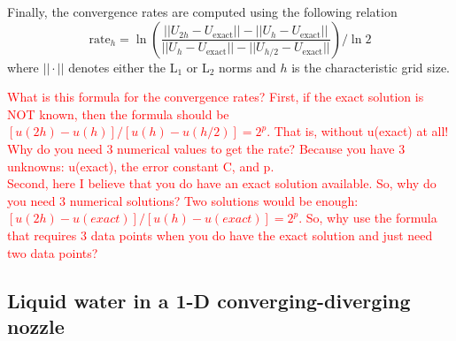 \documentclass[preprint,10pt]{elsarticle}
\newcommand{\tcr}[1]{\textcolor{red}{#1}}
\begin{document}
Finally, the convergence rates are computed using the following relation 
\begin{equation}
\label{eq:conv_rates}
\text{rate}_h = \ln \left( \frac{|| U_{2h}-U_{\text{exact}} || - || U_{h}-U_{\text{exact}} ||}{|| U_{h}-U_{\text{exact}} || - || U_{h/2}-U_{\text{exact}} || } \right) / \ln 2
\end{equation}
where $|| \cdot ||$ denotes either the L$_1$ or L$_2$ norms and $h$ is the characteristic grid size.

\tcr{What is this formula for the convergence rates?
First, if the exact solution is NOT known, then the formula should be
 $[u(2h)-u(h)]/[u(h)-u(h/2)]=2^p$. 
That is, without u(exact) at all! Why do you need 3 numerical values to get the rate? Because you have 3 unknowns: u(exact), the error constant C, and p.\\
Second, here I believe that you do have an exact solution available. So, why do you need 3 numerical solutions? Two solutions would be enough:
$[u(2h)-u(exact)]/[u(h)-u(exact)] = 2^p$.
So, why use the formula that requires 3 data points when you do have the exact solution and just need two data points?
}

\subsection{Liquid water in a 1-D converging-diverging nozzle} \label{sec:liquid_nozzle}
\end{document}

